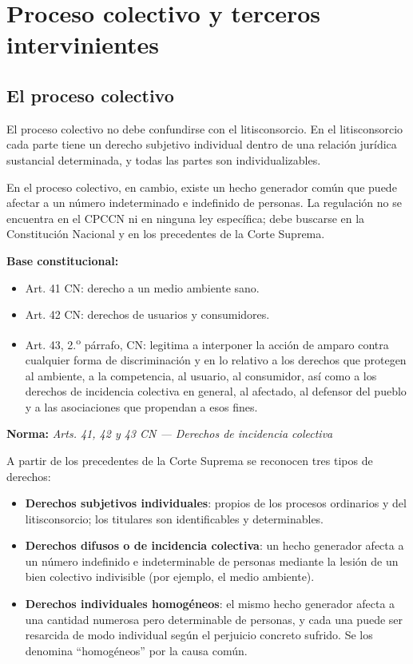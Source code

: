\documentclass[12pt,oneside]{book}
\newcommand{\norma}[1]{%
\par\noindent\textbf{Norma:} \textit{#1}\par\smallskip
}
\begin{document}
\chapter{Proceso colectivo y terceros intervinientes}

\section{El proceso colectivo}

El proceso colectivo no debe confundirse con el litisconsorcio. En el litisconsorcio cada parte tiene un derecho subjetivo individual dentro de una relación jurídica sustancial determinada, y todas las partes son individualizables.

En el proceso colectivo, en cambio, existe un hecho generador común que puede afectar a un número indeterminado e indefinido de personas. La regulación no se encuentra en el CPCCN ni en ninguna ley específica; debe buscarse en la Constitución Nacional y en los precedentes de la Corte Suprema.

\textbf{Base constitucional:}
\begin{itemize}
    \item Art. 41 CN: derecho a un medio ambiente sano.
    \item Art. 42 CN: derechos de usuarios y consumidores.
    \item Art. 43, 2.\textsuperscript{o} párrafo, CN: legitima a interponer la acción de amparo contra cualquier forma de discriminación y en lo relativo a los derechos que protegen al ambiente, a la competencia, al usuario, al consumidor, así como a los derechos de incidencia colectiva en general, al afectado, al defensor del pueblo y a las asociaciones que propendan a esos fines.
\end{itemize}

\norma{Arts. 41, 42 y 43 CN --- Derechos de incidencia colectiva}

A partir de los precedentes de la Corte Suprema se reconocen tres tipos de derechos:

\begin{itemize}
    \item \textbf{Derechos subjetivos individuales}: propios de los procesos ordinarios y del litisconsorcio; los titulares son identificables y determinables.
    \item \textbf{Derechos difusos o de incidencia colectiva}: un hecho generador afecta a un número indefinido e indeterminable de personas mediante la lesión de un bien colectivo indivisible (por ejemplo, el medio ambiente).
    \item \textbf{Derechos individuales homogéneos}: el mismo hecho generador afecta a una cantidad numerosa pero determinable de personas, y cada una puede ser resarcida de modo individual según el perjuicio concreto sufrido. Se los denomina ``homogéneos'' por la causa común.
\end{itemize}
\end{document}
